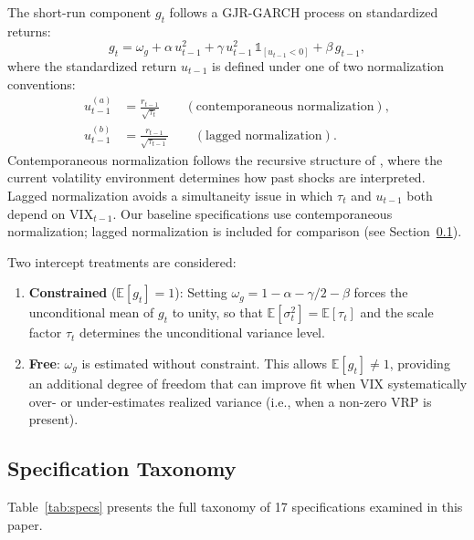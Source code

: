 \documentclass[12pt,a4paper]{article}
\newcommand{\E}{\mathbb{E}}
\begin{document}
The short-run component $g_t$ follows a GJR-GARCH process \citep{glosten1993} on standardized returns:
\begin{equation}
g_t = \omega_g + \alpha \, u_{t-1}^2 + \gamma \, u_{t-1}^2 \, \mathbb{1}_{[u_{t-1}<0]} + \beta \, g_{t-1},
\label{eq:g_gjr}
\end{equation}
where the standardized return $u_{t-1}$ is defined under one of two normalization conventions:
\begin{align}
u_{t-1}^{(a)} &= \frac{r_{t-1}}{\sqrt{\tau_t}} \qquad (\text{contemporaneous normalization}), \label{eq:u_contemp} \\
u_{t-1}^{(b)} &= \frac{r_{t-1}}{\sqrt{\tau_{t-1}}} \qquad (\text{lagged normalization}). \label{eq:u_lagged}
\end{align}
Contemporaneous normalization follows the recursive structure of \citet[Eq.~4]{engle2013}, where the current volatility environment determines how past shocks are interpreted. Lagged normalization avoids a simultaneity issue in which $\tau_t$ and $u_{t-1}$ both depend on $\mathrm{VIX}_{t-1}$. Our baseline specifications use contemporaneous normalization; lagged normalization is included for comparison (see Section~\ref{sec:taxonomy}).

Two intercept treatments are considered:
\begin{enumerate}[label=(\roman*)]
\item \textbf{Constrained} ($\E[g_t] = 1$): Setting $\omega_g = 1 - \alpha - \gamma/2 - \beta$ forces the unconditional mean of $g_t$ to unity, so that $\E[\sigma_t^2] = \E[\tau_t]$ and the scale factor $\tau_t$ determines the unconditional variance level.

\item \textbf{Free}: $\omega_g$ is estimated without constraint. This allows $\E[g_t] \neq 1$, providing an additional degree of freedom that can improve fit when VIX systematically over- or under-estimates realized variance (i.e., when a non-zero VRP is present).
\end{enumerate}

\subsection{Specification Taxonomy}
\label{sec:taxonomy}

Table~\ref{tab:specs} presents the full taxonomy of 17 specifications examined in this paper.
\end{document}
